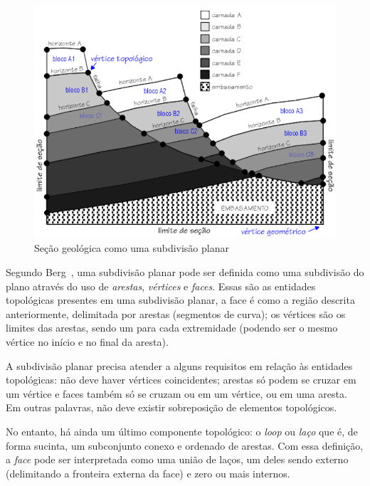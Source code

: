 \begin{figure} [h]
  \begin{center}
    \includegraphics[width=\textwidth]{images/fig-subdivisao-planar}
    \caption{Seção geológica como uma subdivisão planar~\cite{Ferraz}}\label{fig-subdivisao-planar}
  \end{center}
\end{figure}

Segundo Berg~\cite{Berg}, uma subdivisão planar pode ser definida como uma subdivisão do plano através do uso de \textit{arestas}, \textit{vértices} e \textit{faces}. Essas são as entidades topológicas presentes em uma subdivisão planar, a face é como a região descrita anteriormente, delimitada por arestas (segmentos de curva); os vértices são os limites das arestas, sendo um para cada extremidade (podendo ser o mesmo vértice no início e no final da aresta).

A subdivisão planar precisa atender a alguns requisitos em relação às entidades topológicas: não deve haver vértices coincidentes; arestas só podem se cruzar em um vértice e faces também só se cruzam ou em um vértice, ou em uma aresta. Em outras palavras, não deve existir sobreposição de elementos topológicos. 

No entanto, há ainda um último componente topológico: o \textit{loop} ou \textit{laço} que é, de forma sucinta, um subconjunto conexo e ordenado de arestas. Com essa definição, a \textit{face} pode ser interpretada como uma união de laços, um deles sendo externo (delimitando a fronteira externa da face) e zero ou mais internos.


